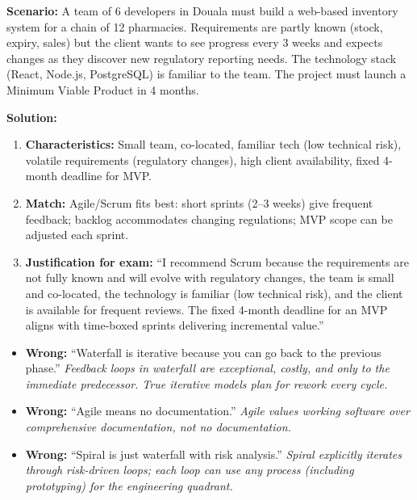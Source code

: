 \documentclass[11pt]{article}
\begin{document}
\begin{exoresolu}
\textbf{Scenario:} A team of 6 developers in Douala must build a web-based inventory system for a chain of 12 pharmacies. Requirements are partly known (stock, expiry, sales) but the client wants to see progress every 3 weeks and expects changes as they discover new regulatory reporting needs. The technology stack (React, Node.js, PostgreSQL) is familiar to the team. The project must launch a Minimum Viable Product in 4 months.

\textbf{Solution:}
\begin{enumerate}
\item \textbf{Characteristics:} Small team, co-located, familiar tech (low technical risk), volatile requirements (regulatory changes), high client availability, fixed 4-month deadline for MVP.
\item \textbf{Match:} Agile/Scrum fits best: short sprints (2--3 weeks) give frequent feedback; backlog accommodates changing regulations; MVP scope can be adjusted each sprint.
\item \textbf{Justification for exam:} ``I recommend Scrum because the requirements are not fully known and will evolve with regulatory changes, the team is small and co-located, the technology is familiar (low technical risk), and the client is available for frequent reviews. The fixed 4-month deadline for an MVP aligns with time-boxed sprints delivering incremental value.''
\end{enumerate}
\end{exoresolu}

\begin{attention}
\begin{itemize}
\item \textbf{Wrong:} ``Waterfall is iterative because you can go back to the previous phase.'' \emph{Feedback loops in waterfall are exceptional, costly, and only to the immediate predecessor. True iterative models plan for rework every cycle.}
\item \textbf{Wrong:} ``Agile means no documentation.'' \emph{Agile values \emph{working software over comprehensive documentation}, not \emph{no documentation}.}
\item \textbf{Wrong:} ``Spiral is just waterfall with risk analysis.'' \emph{Spiral explicitly iterates through risk-driven loops; each loop can use any process (including prototyping) for the engineering quadrant.}
\end{itemize}
\end{attention}
\end{document}
